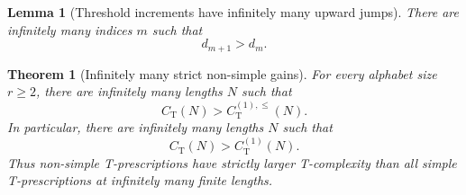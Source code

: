 \documentclass[10pt,a4paper]{amsart}
\newtheorem{theorem}{Theorem}
\newtheorem{lemma}{Lemma}
\newcommand{\CT}{C_{\mathrm T}}
\newcommand{\CTsimp}{C_{\mathrm T}^{(1)}}
\newcommand{\CTsimpenv}{C_{\mathrm T}^{(1),\leq}}
\begin{document}
\begin{lemma}[Threshold increments have infinitely many upward jumps]
\label{lem:jumps}
There are infinitely many indices $m$ such that
\begin{equation}
d_{m+1}>d_m.
\end{equation}
\end{lemma}

\begin{theorem}[Infinitely many strict non-simple gains]
\label{thm:main}
For every alphabet size $r\geq 2$, there are infinitely many lengths $N$ such that
\begin{equation}
\CT(N)>\CTsimpenv(N).
\end{equation}
In particular, there are infinitely many lengths $N$ such that
\begin{equation}
\CT(N)>\CTsimp(N).
\end{equation}
Thus non-simple T-prescriptions have strictly larger T-complexity than all simple T-prescriptions at infinitely many finite lengths.
\end{theorem}
\end{document}
